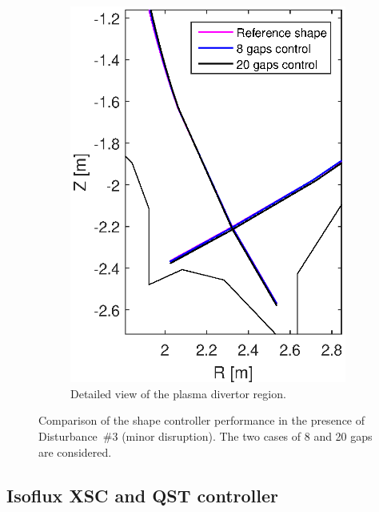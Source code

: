 \begin{figure}
\begin{subfigure}[b]{0.32\textwidth}
		\includegraphics[width=\textwidth]{Chp3/zoom_Ref_20gaps_8gaps_minor_strike_2.eps} 
		\caption{Detailed view of the plasma divertor region. \label{figure:minor_strike}}
	\end{subfigure}
	
	
	\caption{ Comparison of the shape controller performance in the presence of Disturbance~\#3 (minor disruption). The two cases of 8 and 20 gaps are considered.}
\end{figure}

\subsection{Isoflux XSC and QST controller }



